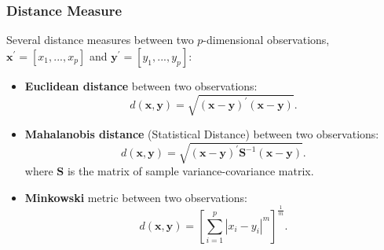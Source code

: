 \documentclass[10pt]{beamer} %
\begin{document}
\begin{frame}
   \frametitle{Distance Measure}
   Several distance measures between two $p$-dimensional observations,
   $\mathbf{x}^{'}=[x_1,...,x_p]$ and $\mathbf{y}^{'} = [y_1,...,y_p]$:
   \vspace{0.5cm}
   \begin{itemize}
      \item \textbf{Euclidean distance} between two observations:
         \begin{equation*}
            d(\mathbf{x},\mathbf{y}) =
            \sqrt{(\mathbf{x}-\mathbf{y})^{'}(\mathbf{x}-\mathbf{y})}.
         \end{equation*}
      \item \textbf{Mahalanobis distance} (Statistical Distance) between two
         observations:
         \begin{equation*}
            d(\mathbf{x},\mathbf{y}) =
            \sqrt{(\mathbf{x}-\mathbf{y})^{'}\mathbf{S}^{-1}(\mathbf{x}-\mathbf{y})}.
         \end{equation*}
         where $\mathbf{S}$ is the matrix of sample variance-covariance matrix.
         \vspace{0.5cm}
      \item \textbf{Minkowski} metric between two observations:
         \begin{equation*}
            d(\mathbf{x},\mathbf{y}) =
            \left[\sum_{i=1}^p|x_i-y_i|^{m}\right]^{\frac{1}{m}}.
         \end{equation*}
   \end{itemize}
\end{frame}

\end{document}
